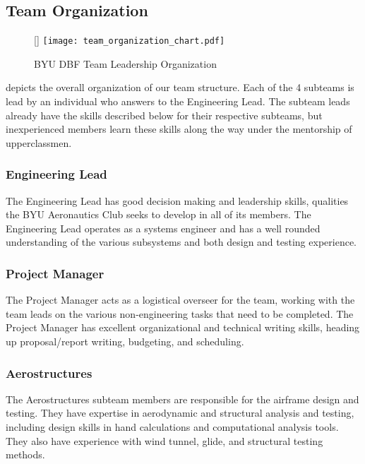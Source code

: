 \subsection{Team Organization}
\label{ssec:TeamOrganization}

\begin{wrapfigure}[8]{R}{0in}
	\centering
	\raisebox{0pt}[\dimexpr{}\baselineskip\relax]{
		\texttt{[image: team\_organization\_chart.pdf]}}
	\caption{BYU DBF Team Leadership Organization}
	\label{fig:personnelassignments}
\end{wrapfigure}

 depicts the overall organization of our team structure.  Each of the 4 subteams is lead by an individual who answers to the Engineering Lead.  The subteam leads already have the skills described below for their respective subteams, but inexperienced members learn these skills along the way under the mentorship of upperclassmen.





\subsubsection{Engineering Lead} The Engineering Lead has good decision making and leadership skills, qualities the BYU Aeronautics Club seeks to develop in all of its members. 
The Engineering Lead operates as a systems engineer and has a well rounded understanding of the various subsystems and both design and testing experience.

\subsubsection{Project Manager} The Project Manager acts as a logistical overseer for the team, working with the team leads on the various non-engineering tasks that need to be completed. The Project Manager has excellent organizational and technical writing skills, heading up proposal/report writing, budgeting, and scheduling.
\subsubsection{Aerostructures} The Aerostructures subteam members are responsible for the airframe design and testing. They have expertise in aerodynamic and structural analysis and testing, including design skills in hand calculations and computational analysis tools. They also have experience with wind tunnel, glide, and structural testing methods.
